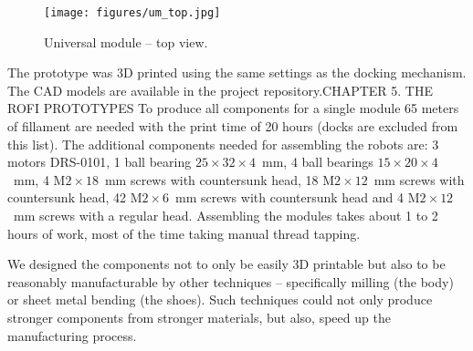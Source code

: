 \begin{figure}[!t]
    \centering
    \texttt{[image: figures/um\_top.jpg]}
    \caption{Universal module -- top view.}
    \label{fig:um_photo_top}
\end{figure}

The prototype was 3D printed using the same settings as the docking mechanism.
The CAD models are available in the project repository.CHAPTER 5. THE ROFI PROTOTYPES To produce all
components for a single module 65 meters of fillament are needed with the print
time of 20 hours (docks are excluded from this list). The additional components
needed for assembling the robots are: 3 motors DRS-0101, 1 ball bearing
$25\times32\times4$~mm, 4 ball bearings $15\times20\times4$~mm, 4
M$2\times18$~mm screws with countersunk head, 18 M$2\times12$~mm screws with
countersunk head, 42 M$2\times6$~mm screws with countersunk head and 4
M$2\times12$~mm screws with a regular head. Assembling the modules takes about 1
to 2 hours of work, most of the time taking manual thread tapping.

We designed the components not to only be easily 3D printable but also to be
reasonably manufacturable by other techniques -- specifically milling (the body)
or sheet metal bending (the shoes). Such techniques could not only produce
stronger components from stronger materials, but also, speed up the
manufacturing process.